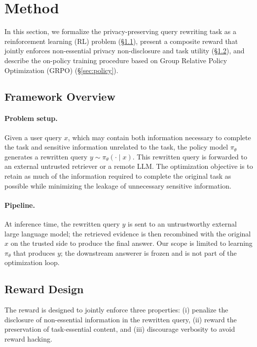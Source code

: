 \section{Method}
\label{sec:method}

In this section, we formalize the privacy-preserving query rewriting
task as a reinforcement learning (RL) problem
(\S\ref{sec:framework}), present a composite reward that jointly
enforces non-essential privacy non-disclosure and task utility
(\S\ref{sec:reward}), and describe the on-policy training procedure
based on Group Relative Policy Optimization (GRPO)
(\S\ref{sec:policy}).

\subsection{Framework Overview}
\label{sec:framework}

\paragraph{Problem setup.}
Given a user query $x$, which may contain both information necessary
to complete the task and sensitive information unrelated to the task,
the policy model $\pi_\theta$ generates a rewritten query
$y \sim \pi_\theta(\cdot \mid x)$. This rewritten query is forwarded
to an external untrusted retriever or a remote LLM. The optimization
objective is to retain as much of the information required to
complete the original task as possible while minimizing the leakage
of unnecessary sensitive information.

\paragraph{Pipeline.}
At inference time, the rewritten query $y$ is sent to an untrustworthy
external large language model; the retrieved evidence is then
recombined with the original $x$ on the trusted side to produce the
final answer. Our scope is limited to learning $\pi_\theta$ that
produces $y$; the downstream answerer is frozen and is not part of
the optimization loop.

\subsection{Reward Design}
\label{sec:reward}

The reward is designed to jointly enforce three properties: (i)
penalize the disclosure of non-essential information in the rewritten
query, (ii) reward the preservation of task-essential content, and
(iii) discourage verbosity to avoid reward hacking.

